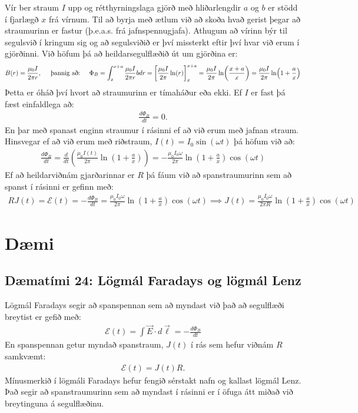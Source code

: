 \ifdefined \wholebook \else\documentclass[oneside]{book}\usepackage{EdlBook}\graphicspath{{figures/}}
\begin{document}
Vír ber straum $I$ upp og rétthyrningslaga gjörð með hliðarlengdir $a$ og $b$ er stödd í fjarlægð $x$ frá vírnum. Til að byrja með ætlum við að skoða hvað gerist þegar að straumurinn er fastur (þ.e.a.s. frá jafnspennugjafa). Athugum að vírinn býr til segulsvið í kringum sig og að segulsviðið er því missterkt eftir því hvar við erum í gjörðinni. Við höfum þá að heildarsegulflæðið út um gjörðina er:
\begin{align*}
    B(r) = \frac{\mu_0 I}{2\pi r}, \hspace{0.5cm} \text{þannig að:} \hspace{0.5cm}
    \Phi_B = \int_{x}^{x+a} \frac{\mu_0 I}{2\pi r} b dr = \left[ \frac{\mu_0 I}{2\pi} \ln(r) \right]_{x}^{x+a} = \frac{\mu_0 I}{2\pi} \ln(\frac{x+a}{x}) = \frac{\mu_0 I}{2\pi} \ln(1 + \frac{a}{x})
\end{align*}
Þetta er óháð því hvort að straumurinn er tímaháður eða ekki. Ef $I$ er fast þá fæst einfaldlega að:
\begin{align*}
    \frac{d\Phi_B}{dt} = 0.
\end{align*}
En þar með spanast enginn straumur í rásinni ef að við erum með jafnan straum. Hinsvegar ef að við erum með riðstraum, $I(t) = I_0 \sin(\omega t)$ þá höfum við að:
\begin{align*}
    \frac{d \Phi_B}{dt} = \frac{d}{dt}\left( \frac{\mu_0 I(t)}{2\pi} \ln(1 + \frac{a}{x}) \right) = -\frac{\mu_0 I_0 \omega}{2 \pi} \ln(1 + \frac{a}{x}) \cos(\omega t)
\end{align*}
Ef að heildarviðnám gjarðarinnar er $R$ þá fáum við að spanstraumurinn sem að spanst í rásinni er gefinn með:
\begin{align*}
    R J(t) = \mathcal{E}(t) = -\frac{d\Phi_B}{dt} = \frac{\mu_0 I_0 \omega}{2 \pi} \ln(1 + \frac{a}{x}) \cos(\omega t) \implies J(t) = \frac{\mu_0 I_0 \omega}{2 \pi R} \ln(1 + \frac{a}{x}) \cos(\omega t)
\end{align*}


\newpage

\section{Dæmi}

\subsection*{Dæmatími 24: Lögmál Faradays og lögmál Lenz}

\begin{tcolorbox}
Lögmál Faradays segir að spanspennan sem að myndast við það að segulflæði breytist er gefið með:
\begin{align*}
     \mathcal{E}(t) = \int \vec{E} \cdot d\vec{\ell} = -\frac{d \Phi_B}{dt}
\end{align*}
 En spanspennan getur myndað spanstraum, $J(t)$ í rás sem hefur viðnám $R$ samkvæmt:
\begin{align*}
     \mathcal{E}(t) = J(t) R.
\end{align*}
Mínusmerkið í lögmáli Faradays hefur fengið sérstakt nafn og kallast lögmál Lenz. Það segir að spanstraumurinn sem að myndast í rásinni er í öfuga átt miðað við breytinguna á segulflæðinu.
\end{tcolorbox}
\end{document}
